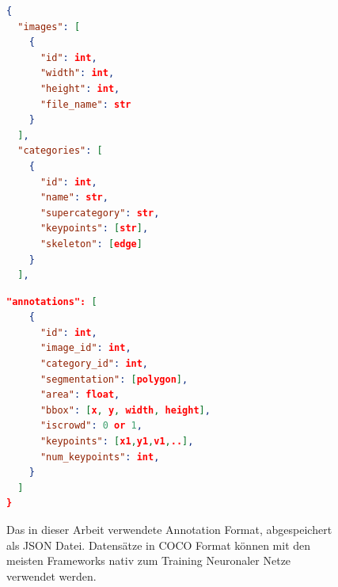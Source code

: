 \begin{figure}[h]
    \centering
    \begin{minipage}{0.43\textwidth}
        \begin{lstlisting}[language=json,firstnumber=1]
{
  "images": [
    {
      "id": int,
      "width": int,
      "height": int,
      "file_name": str
    }
  ],
  "categories": [
    {
      "id": int,
      "name": str,
      "supercategory": str,
      "keypoints": [str],
      "skeleton": [edge]
    }
  ],
        \end{lstlisting}
    \end{minipage}\hfill
    \begin{minipage}{0.53\textwidth}
        \begin{lstlisting}[language=json,firstnumber=19]
  "annotations": [
    {
      "id": int,
      "image_id": int,
      "category_id": int,
      "segmentation": [polygon],
      "area": float,
      "bbox": [x, y, width, height],
      "iscrowd": 0 or 1,
      "keypoints": [x1,y1,v1,..],
      "num_keypoints": int,
    }
  ]
}
    \end{lstlisting}
    \vspace{1.6cm}
    \end{minipage}
    \caption{Das in dieser Arbeit verwendete Annotation Format, abgespeichert als JSON Datei. Datensätze in COCO Format können mit den meisten Frameworks nativ zum Training Neuronaler Netze verwendet werden.}
    \label{fig:datform}
\end{figure}